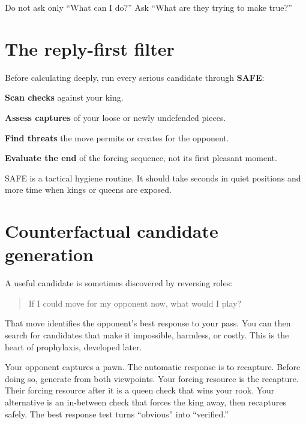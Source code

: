 \begin{intuitionbox}
Do not ask only ``What can I do?'' Ask ``What are they trying to make true?''
\end{intuitionbox}

\section{The reply-first filter}
Before calculating deeply, run every serious candidate through \textbf{SAFE}:

\begin{description}[style=multiline,leftmargin=3.0em,labelwidth=2.3em]
\item[S] \textbf{Scan checks} against your king.
\item[A] \textbf{Assess captures} of your loose or newly undefended pieces.
\item[F] \textbf{Find threats} the move permits or creates for the opponent.
\item[E] \textbf{Evaluate the end} of the forcing sequence, not its first pleasant moment.
\end{description}

SAFE is a tactical hygiene routine. It should take seconds in quiet positions and more time when kings or queens are exposed.

\section{Counterfactual candidate generation}
A useful candidate is sometimes discovered by reversing roles:

\begin{quote}
If I could move for my opponent now, what would I play?
\end{quote}

That move identifies the opponent's best response to your pass. You can then search for candidates that make it impossible, harmless, or costly. This is the heart of prophylaxis, developed later.

\begin{workedbox}[title={Worked example: the natural recapture}]
Your opponent captures a pawn. The automatic response is to recapture. Before doing so, generate from both viewpoints. Your forcing resource is the recapture. Their forcing resource after it is a queen check that wins your rook. Your alternative is an in-between check that forces the king away, then recaptures safely. The best response test turns ``obvious'' into ``verified.''
\end{workedbox}

